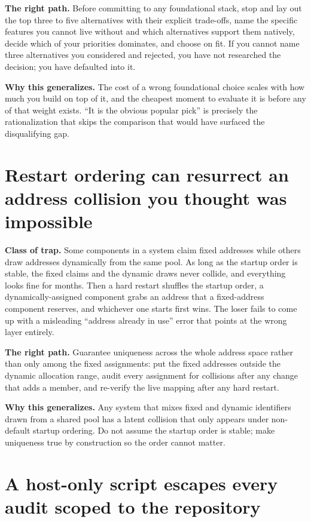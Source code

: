 \documentclass[12pt]{article}
\begin{document}
\textbf{The right path.} Before committing to any foundational stack, stop and lay out the top three to five alternatives with their explicit trade-offs, name the specific features you cannot live without and which alternatives support them natively, decide which of your priorities dominates, and choose on fit. If you cannot name three alternatives you considered and rejected, you have not researched the decision; you have defaulted into it.

\textbf{Why this generalizes.} The cost of a wrong foundational choice scales with how much you build on top of it, and the cheapest moment to evaluate it is before any of that weight exists. ``It is the obvious popular pick'' is precisely the rationalization that skips the comparison that would have surfaced the disqualifying gap.

\section{Restart ordering can resurrect an address collision you thought was impossible}

\textbf{Class of trap.} Some components in a system claim fixed addresses while others draw addresses dynamically from the same pool. As long as the startup order is stable, the fixed claims and the dynamic draws never collide, and everything looks fine for months. Then a hard restart shuffles the startup order, a dynamically-assigned component grabs an address that a fixed-address component reserves, and whichever one starts first wins. The loser fails to come up with a misleading ``address already in use'' error that points at the wrong layer entirely.

\textbf{The right path.} Guarantee uniqueness across the whole address space rather than only among the fixed assignments: put the fixed addresses outside the dynamic allocation range, audit every assignment for collisions after any change that adds a member, and re-verify the live mapping after any hard restart.

\textbf{Why this generalizes.} Any system that mixes fixed and dynamic identifiers drawn from a shared pool has a latent collision that only appears under non-default startup ordering. Do not assume the startup order is stable; make uniqueness true by construction so the order cannot matter.

\section{A host-only script escapes every audit scoped to the repository}
\end{document}

